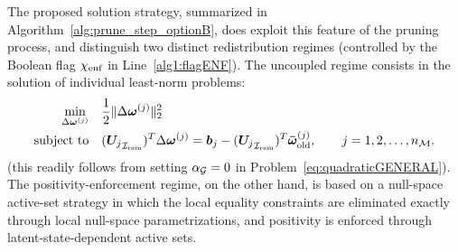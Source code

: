 \documentclass[11pt,a4paper]{article}
\begin{document}
The proposed solution strategy, summarized in Algorithm~\ref{alg:prune_step_optionB}, does exploit this  feature of the pruning
process, and distinguish two distinct    redistribution regimes (controlled by
the Boolean flag \(\chi_{\mathrm{enf}}\) in Line~\ref{alg1:flagENF}). The uncoupled regime consists in the solution of individual least-norm problems:
\begin{equation}
\label{eq:smallproblems}
\begin{aligned}
\min_{\Delta\bm{\omega}^{(j)}}
\quad &
\frac12
\|
\Delta\bm{\omega}^{(j)}
\|_2^2
\\
\text{subject to}
\quad &
({\bm{U}_{j}}_{\mathcal{I}_{\mathrm{rem}}})^T\Delta\bm{\omega}^{(j)}
=
\bm{b}_{j} - ({\bm{U}_{j}}_{\mathcal{I}_{\mathrm{rem}}})^T\bm{\bar{\omega}}^{(j)}_{\mathrm{old}},
\qquad
j=1,2,\ldots,n_{\mathcal{M}}.
\end{aligned}
\end{equation}
(this readily follows from setting $\alpha_{\mathcal{G}} = 0$ in  Problem~\eqref{eq:quadraticGENERAL}). The
positivity-enforcement regime, on the other hand,  is  based on  a null-space active-set strategy in
which the local equality constraints are eliminated exactly through
local null-space parametrizations, and positivity  is enforced
through latent-state-dependent active sets.




%



%
%



\end{document}
